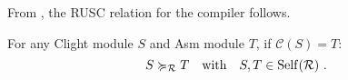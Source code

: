 From , the RUSC relation for the compiler follows.
\begin{theorem} \label{thm:results-modular}
  For any \textrm{Clight} module $S$ and \textrm{Asm} module $T$, if $\mathcal{C}(S) = T$:
  \[
    {S} \succcurlyeq_{\mathcal{R}} {T} \quad\text{with}\quad S,T \in \mathrm{Self}(\mathcal{R})~.
  \]
\end{theorem}








